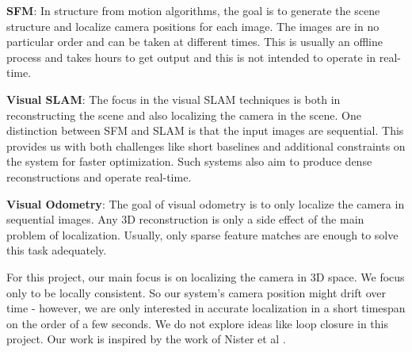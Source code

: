 \documentclass{article}
\begin{document}
\textbf{SFM}: In structure from motion algorithms, the goal is to generate the scene structure and localize camera positions for each image. The images are in no particular order and can be taken at different times. This is usually an offline process and takes hours to get output and this is not intended to operate in real-time.

\textbf{Visual SLAM}: The focus in the visual SLAM techniques is both in reconstructing the scene and also localizing the camera in the scene. One distinction between SFM and SLAM is that the input images are sequential. This provides us with both challenges like short baselines and additional constraints on the system for faster optimization. Such systems also aim to produce dense reconstructions and operate real-time.

\textbf{Visual Odometry}: The goal of visual odometry is to only localize the camera in sequential images. Any 3D reconstruction is only a side effect of the main problem of localization. Usually, only sparse feature matches are enough to solve this task adequately.

For this project, our main focus is on localizing the camera in 3D space. We focus only to be locally consistent. So our system's camera position might drift over time - however, we are only interested in accurate localization in a short timespan on the order of a few seconds. We do not explore ideas like loop closure in this project. Our work is inspired by the work of Nister et al \cite{vo}.
\end{document}

